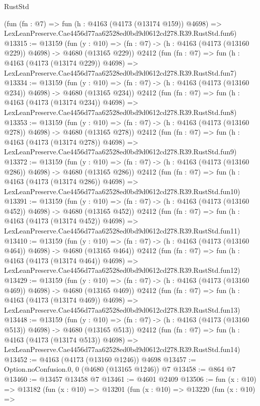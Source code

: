 \begin{lexlean}{RustStd}
\begin{coremodule}
    (fun (fn : @7) =>
    fun (h : @4163 (@4173 (@13174 @159)) @4698) =>
    LexLeanPreserve.Cae4456d77aa62528ed0bd9d0612cd278.R39.RustStd.fun6)
@13315 := @13159
    (fun (y : @10) => (fn : @7) -> (h : @4163 (@4173 (@13160 @229)) @4698) -> @4680 (@13165 @229))
    @2412
    (fun (fn : @7) =>
    fun (h : @4163 (@4173 (@13174 @229)) @4698) =>
    LexLeanPreserve.Cae4456d77aa62528ed0bd9d0612cd278.R39.RustStd.fun7)
@13334 := @13159
    (fun (y : @10) => (fn : @7) -> (h : @4163 (@4173 (@13160 @234)) @4698) -> @4680 (@13165 @234))
    @2412
    (fun (fn : @7) =>
    fun (h : @4163 (@4173 (@13174 @234)) @4698) =>
    LexLeanPreserve.Cae4456d77aa62528ed0bd9d0612cd278.R39.RustStd.fun8)
@13353 := @13159
    (fun (y : @10) => (fn : @7) -> (h : @4163 (@4173 (@13160 @278)) @4698) -> @4680 (@13165 @278))
    @2412
    (fun (fn : @7) =>
    fun (h : @4163 (@4173 (@13174 @278)) @4698) =>
    LexLeanPreserve.Cae4456d77aa62528ed0bd9d0612cd278.R39.RustStd.fun9)
@13372 := @13159
    (fun (y : @10) => (fn : @7) -> (h : @4163 (@4173 (@13160 @286)) @4698) -> @4680 (@13165 @286))
    @2412
    (fun (fn : @7) =>
    fun (h : @4163 (@4173 (@13174 @286)) @4698) =>
    LexLeanPreserve.Cae4456d77aa62528ed0bd9d0612cd278.R39.RustStd.fun10)
@13391 := @13159
    (fun (y : @10) => (fn : @7) -> (h : @4163 (@4173 (@13160 @452)) @4698) -> @4680 (@13165 @452))
    @2412
    (fun (fn : @7) =>
    fun (h : @4163 (@4173 (@13174 @452)) @4698) =>
    LexLeanPreserve.Cae4456d77aa62528ed0bd9d0612cd278.R39.RustStd.fun11)
@13410 := @13159
    (fun (y : @10) => (fn : @7) -> (h : @4163 (@4173 (@13160 @464)) @4698) -> @4680 (@13165 @464))
    @2412
    (fun (fn : @7) =>
    fun (h : @4163 (@4173 (@13174 @464)) @4698) =>
    LexLeanPreserve.Cae4456d77aa62528ed0bd9d0612cd278.R39.RustStd.fun12)
@13429 := @13159
    (fun (y : @10) => (fn : @7) -> (h : @4163 (@4173 (@13160 @469)) @4698) -> @4680 (@13165 @469))
    @2412
    (fun (fn : @7) =>
    fun (h : @4163 (@4173 (@13174 @469)) @4698) =>
    LexLeanPreserve.Cae4456d77aa62528ed0bd9d0612cd278.R39.RustStd.fun13)
@13448 := @13159
    (fun (y : @10) => (fn : @7) -> (h : @4163 (@4173 (@13160 @513)) @4698) -> @4680 (@13165 @513))
    @2412
    (fun (fn : @7) =>
    fun (h : @4163 (@4173 (@13174 @513)) @4698) =>
    LexLeanPreserve.Cae4456d77aa62528ed0bd9d0612cd278.R39.RustStd.fun14)
@13452 := @4163 (@4173 (@13160 @1246)) @4698
@13457 := Option.noConfusion.{0, 0} (@4680 (@13165 @1246)) @7
@13458 := @864 @7
@13460 := @13457 @13458 @7
@13461 := @4601 @2409
@13506 := fun (x : @10) =>
  @13182
    (fun (x : @10) =>
    @13201
      (fun (x : @10) =>
      @13220
        (fun (x : @10) =>

\end{coremodule}
\end{lexlean}
